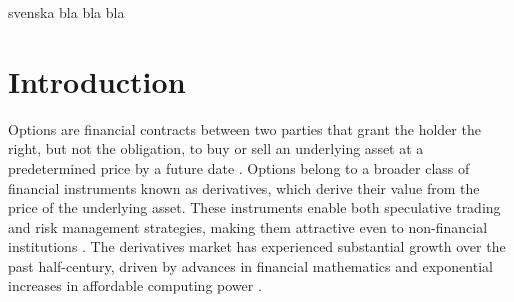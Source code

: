 \documentclass[english,12pt,a4paper,pdftex,sci,utf8]{aaltothesis}
\begin{document}
\newpage
%

\newpage
%
%
\begin{abstractpage}[swedish]
 svenska bla bla bla
\end{abstractpage}

\newpage



\thesistableofcontents




\cleardoublepage
\storeinipagenumber
{}
\setcounter{page}{1}


\section{Introduction}
\thispagestyle{empty}
Options are financial contracts between two parties that grant the holder the right, but not the obligation, to buy or sell an underlying asset at a predetermined price by a future date \cite{hull2016options}. Options belong to a broader class of financial instruments known as derivatives, which derive their value from the price of the underlying asset. These instruments enable both speculative trading and risk management strategies, making them attractive even to non-financial institutions \cite{bartram2009international}. The derivatives market has experienced substantial growth over the past half-century, driven by advances in financial mathematics \cite{merton1994influence} and exponential increases in affordable computing power \cite{nordhaus2007two}.
\end{document}
